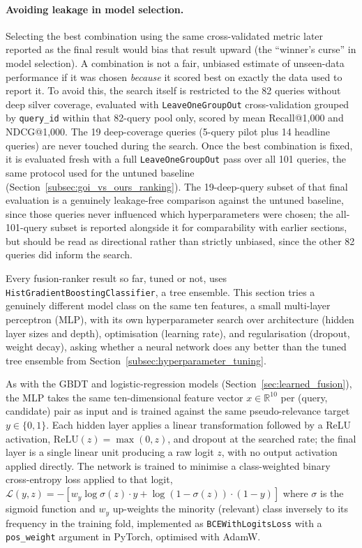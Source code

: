 \documentclass[a4paper,oneside,bibliography=totoc]{scrbook}
\begin{document}
\paragraph{Avoiding leakage in model selection.} Selecting the best combination using the same cross-validated metric later reported as the final result would bias that result upward (the ``winner's curse'' in model selection). A combination is not a fair, unbiased estimate of unseen-data performance if it was chosen \emph{because} it scored best on exactly the data used to report it. To avoid this, the search itself is restricted to the 82 queries without deep silver coverage, evaluated with \texttt{LeaveOneGroupOut} cross-validation grouped by \texttt{query\_id} within that 82-query pool only, scored by mean Recall@1{,}000 and NDCG@1{,}000. The 19 deep-coverage queries (5-query pilot plus 14 headline queries) are never touched during the search. Once the best combination is fixed, it is evaluated fresh with a full \texttt{LeaveOneGroupOut} pass over all 101 queries, the same protocol used for the untuned baseline (Section~\ref{subsec:goi_vs_ours_ranking}). The 19-deep-query subset of that final evaluation is a genuinely leakage-free comparison against the untuned baseline, since those queries never influenced which hyperparameters were chosen; the all-101-query subset is reported alongside it for comparability with earlier sections, but should be read as directional rather than strictly unbiased, since the other 82 queries did inform the search.

\label{subsec:neural_fusion_ranker}

Every fusion-ranker result so far, tuned or not, uses \texttt{HistGradientBoostingClassifier}, a tree ensemble. This section tries a genuinely different model class on the same ten features, a small multi-layer perceptron (MLP), with its own hyperparameter search over architecture (hidden layer sizes and depth), optimisation (learning rate), and regularisation (dropout, weight decay), asking whether a neural network does any better than the tuned tree ensemble from Section~\ref{subsec:hyperparameter_tuning}.

As with the GBDT and logistic-regression models (Section~\ref{sec:learned_fusion}), the MLP takes the same ten-dimensional feature vector $x \in \mathbb{R}^{10}$ per (query, candidate) pair as input and is trained against the same pseudo-relevance target $y \in \{0, 1\}$. Each hidden layer applies a linear transformation followed by a ReLU activation, $\mathrm{ReLU}(z) = \max(0, z)$, and dropout at the searched rate; the final layer is a single linear unit producing a raw logit $z$, with no output activation applied directly. The network is trained to minimise a class-weighted binary cross-entropy loss applied to that logit, $\mathcal{L}(y, z) = -\left[w_y \log \sigma(z) \cdot y + \log(1 - \sigma(z)) \cdot (1 - y)\right]$ where $\sigma$ is the sigmoid function and $w_y$ up-weights the minority (relevant) class inversely to its frequency in the training fold, implemented as \texttt{BCEWithLogitsLoss} with a \texttt{pos\_weight} argument in PyTorch, optimised with AdamW.
\end{document}
